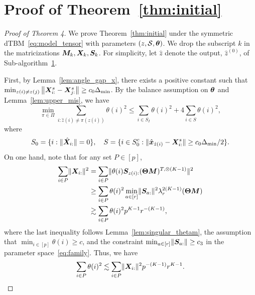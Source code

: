 \documentclass[lettersize,onecolumn,journal]{IEEEtran}
\theoremstyle{definition}
\theoremstyle{definition}
\begin{document}
\section*{Proof of Theorem~\ref{thm:initial}}
\begin{proof}[Proof of Theorem 4] We prove Theorem~\ref{thm:initial} under the symmetric dTBM~\eqref{eq:model_tensor} with parameters $(z, \mathcal{S}, \boldsymbol{\theta})$. We drop the subscript $k$ in the matricizations $\bm M_k, \bm X_k, \bm S_k$. For simplicity, let $\hat z$ denote the output, $\hat z^{(0)}$, of Sub-algorithm~\hyperref[alg:main]{1}.

First, by Lemma~\ref{lem:angle_gap_x}, there exists a positive constant such that $\min_{z(i) \neq z(j)} \left\lVert \bm X^s_{i:} - \bm X^s_{j:} \right\rVert \geq c_0  \Delta_{\min}$. By the balance assumption on $\boldsymbol{\theta}$ and Lemma~\ref{lem:upper_mis}, we have 
 \begin{equation}\label{eq:theta_bound}
          \min_{\pi \in \Pi} \sum_{i : \hat z(i) \neq \pi(z(i))} \theta(i)^2  \leq  \sum_{i \in S_I} \theta(i)^2 + 4 \sum_{i \in S} \theta(i)^2 ,
    \end{equation}
    where 
    \begin{equation}
        S_0 = \{i: \lVert\hat {\bm X}_{i:}\rVert = 0\}, \quad S = \{i \in S_0^c: \lVert\hat {\bm x}_{\hat z(i)} - \bm X_{i:}^s \rVert \geq c_0  \Delta_{\min}/2\}.
    \end{equation}
    On one hand, note that for any set $P \in [p]$,
    \begin{align}
        \sum_{i \in P} \lVert\bm X_{i:}\rVert^2 &= \sum_{i \in P} \lVert \theta(i) \bm S_{z(i):} (\boldsymbol{\Theta} \bm M)^{T, \otimes (K-1)} \rVert^2 \\
        & \geq \sum_{i \in P} \theta(i)^2 \min_{a \in [r]} \lVert\bm S_{a:}\rVert^2 \lambda_{r}^{2(K-1)} (\boldsymbol{\Theta} \bm M)\\
        & \gtrsim \sum_{i \in P} \theta(i)^2 p^{K-1} r^{-(K-1)}, 
    \end{align}
    where the last inequality follows Lemma~\ref{lem:singular_thetam}, the assumption that $\min_{i \in [p]} \theta(i) \geq c$, and the constraint $\min_{a \in [r]} \lVert\bm S_{a:}\rVert \geq c_3$ in the parameter space~\eqref{eq:family}. Thus, we have 
    \begin{equation}\label{eq:theta_p}
        \sum_{i \in P} \theta(i)^2 \lesssim \sum_{i \in P} \onormSize{}{\mX_{i:}}^2 p^{-(K-1)} r^{K-1}.
    \end{equation}
    

\end{proof}
\end{document}
